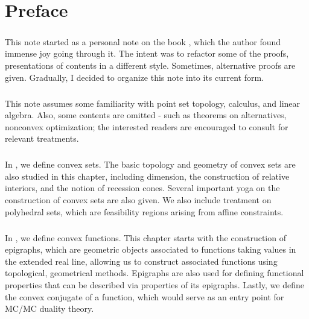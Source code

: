 \chapter*{Preface}

\paragraph{}This note started as a personal note on the book \cite{bertsekas2009convex}, which the author found immense joy going through it. The intent was to refactor some of the proofs, presentations of contents in a different style. Sometimes, alternative proofs are given. Gradually, I decided to organize this note into its current form.

\paragraph{}This note assumes some familiarity with point set topology, calculus, and linear algebra. Also, some contents are omitted - such as theorems on alternatives, nonconvex optimization; the interested readers are encouraged to consult \cite{bertsekas2009convex} for relevant treatments.

\paragraph{}In , we define convex sets. The basic topology and geometry of convex sets are also studied in this chapter, including dimension, the construction of relative interiors, and the notion of recession cones. Several important yoga on the construction of convex sets are also given. We also include treatment on polyhedral sets, which are feasibility regions arising from affine constraints.

\paragraph{}In , we define convex functions. This chapter starts with the construction of epigraphs, which are geometric objects associated to functions taking values in the extended real line, allowing us to construct associated functions using topological, geometrical methods. Epigraphs are also used for defining functional properties that can be described via properties of its epigraphs. Lastly, we define the convex conjugate of a function, which would serve as an entry point for MC/MC duality theory.

